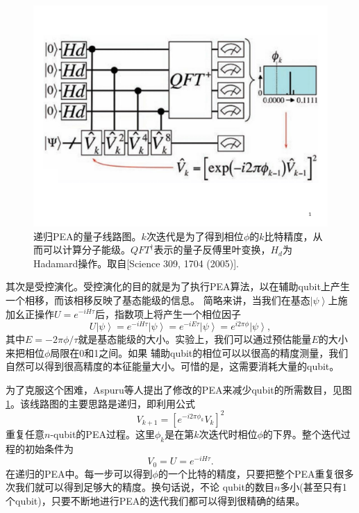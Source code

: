 \begin{figure}[htbp]
            \begin{center}
              \includegraphics[width= 0.8\columnwidth]{figures/moleculenet.pdf}
              \caption{递归PEA的量子线路图。$k$次迭代是为了得到相位$\phi$的$k$比特精度，从而可以计算分子能级。$QFT^{\dagger}$表示的量子反傅里叶变换，$H_d$为Hadamard操作。取自[Science 309, 1704 (2005)\cite{Alan_first}]. }\label{moleculenet}
            \end{center}
 \end{figure}

其次是受控演化。受控演化的目的就是为了执行PEA算法，以在辅助qubit上产生一个相移，而该相移反映了基态能级的信息。
简略来讲，当我们在基态$\left\vert \psi \right\rangle$上施加幺正操作$U=e^{-iH\tau}$后，指数项上将产生一个相位因子
\begin{equation}
U \left\vert \psi \right\rangle =
e^{-iH\tau}\left\vert \psi \right\rangle =
e^{-iE\tau}\left\vert \psi \right\rangle =
e^{i2 \pi \phi}\left\vert \psi \right\rangle,
\end{equation}
其中$E=-2\pi\phi/\tau$就是基态能级的大小。实验上，我们可以通过预估能量$E$的大小来把相位$\phi$局限在0和1之间。如果
辅助qubit的相位可以以很高的精度测量，我们自然可以得到很高精度的本征能量大小。可惜的是，这需要消耗大量的qubit。

为了克服这个困难，Aspuru等人提出了修改的PEA来减少qubit的所需数目，见图\ref{moleculenet}。该线路图的主要思路是递归，即利用公式
\begin{equation}
V_{k+1}=[e^{-i2 \pi \phi_k}V_k]^2
\end{equation}
重复任意$n$-qubit的PEA过程。这里$\phi_k$是在第$k$次迭代时相位$\phi$的下界。整个迭代过程的初始条件为
\begin{equation}
V_{0}=U=e^{-iH\tau}.
\end{equation}
在递归的PEA中。每一步可以得到$\phi$的一个比特的精度，只要把整个PEA重复很多次我们就可以得到足够大的精度。换句话说，不论
qubit的数目$n$多小(甚至只有1个qubit)，只要不断地进行PEA的迭代我们都可以得到很精确的结果。

